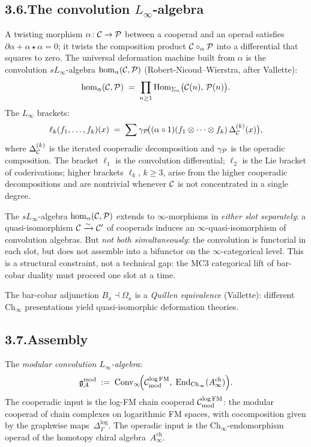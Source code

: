 \subsection*{3.6.\enspace The convolution $L_\infty$-algebra}

A twisting morphism $\alpha\colon\mathcal{C}\to\mathcal{P}$ between a cooperad
and an operad satisfies
$\partial\alpha+\alpha\star\alpha=0$; it twists the
composition product $\mathcal{C}\circ_\alpha\mathcal{P}$ into a differential that
squares to zero. The universal deformation machine built from
$\alpha$ is the convolution
$sL_\infty$-algebra $\mathrm{hom}_\alpha(\mathcal{C},\mathcal{P})$
(Robert-Nicoud--Wierstra, after Vallette):
\[
\mathrm{hom}_\alpha(\mathcal{C},\mathcal{P})
\;=\;
\prod_{n\ge 1}
\mathrm{Hom}_{\Sigma_n}\bigl(\mathcal{C}(n),\,\mathcal{P}(n)\bigr).
\]
The $L_\infty$ brackets:
\[
\ell_k(f_1,\dots,f_k)(x)
\;=\;
\sum
\gamma_{\mathcal{P}}\!\bigl(
(\alpha\circ 1)(f_1\otimes\cdots\otimes f_k)\,
\Delta^{(k)}_{\mathcal{C}}(x)
\bigr),
\]
where $\Delta^{(k)}_{\mathcal{C}}$ is the iterated cooperadic decomposition
and $\gamma_{\mathcal{P}}$ is the operadic composition. The bracket $\ell_1$
is the convolution differential; $\ell_2$ is the Lie bracket of
coderivations; higher brackets $\ell_k$, $k\ge 3$, arise from the
higher cooperadic decompositions and are nontrivial whenever $\mathcal{C}$
is not concentrated in a single degree.

The $sL_\infty$-algebra $\mathrm{hom}_\alpha(\mathcal{C},\mathcal{P})$ extends to
$\infty$-morphisms in \emph{either slot separately}: a
quasi-isomorphism $\mathcal{C}\xrightarrow{\sim}\mathcal{C}'$ of cooperads induces
an $\infty$-quasi-isomorphism of convolution algebras. But
\emph{not both simultaneously}: the convolution is functorial in
each slot, but does not assemble into a bifunctor on the
$\infty$-categorical level. This is a structural constraint, not
a technical gap: the MC3 categorical lift of bar-cobar duality
must proceed one slot at a time.

The bar-cobar adjunction $B_\kappa\dashv\Omega_\kappa$ is a
\emph{Quillen equivalence} (Vallette): different
$\mathrm{Ch}_\infty$ presentations yield quasi-isomorphic
deformation theories.

\subsection*{3.7.\enspace Assembly}

The \emph{modular convolution $L_\infty$-algebra}:
\begin{equation}\label{eq:pref-convolution}
\mathfrak g^{\mathrm{mod}}_{\mathcal{A}}
\;:=\;
\mathrm{Conv}_\infty\!\Bigl(
\mathcal{C}^{\log\mathrm{FM}}_{\mathrm{mod}},\;
\mathrm{End}_{\mathrm{Ch}_\infty}(A^{\mathrm{ch}}_\infty)
\Bigr).
\end{equation}
The cooperadic input is the log-FM chain cooperad
$\mathcal{C}^{\log\mathrm{FM}}_{\mathrm{mod}}$: the modular cooperad of
chain complexes on logarithmic FM spaces, with cocomposition given
by the graphwise maps~$\Delta^{\log}_\Gamma$. The operadic input
is the $\mathrm{Ch}_\infty$-endomorphism operad of the homotopy
chiral algebra~$A^{\mathrm{ch}}_\infty$.

